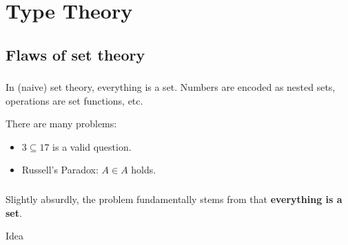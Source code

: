 
\section{Type Theory}

\subsection{Flaws of set theory}
\begin{frame}\frametitle{\insertsubsection}

In (naive) set theory, everything is a set. Numbers are encoded as nested sets, operations are set functions, etc.

There are many problems:

\begin{itemize}

\item \(3 \subseteq 17\) is a valid question.

\item Russell's Paradox: \(A \in A\) holds.

\end{itemize}

\end{frame}




\begin{frame}\frametitle{\insertsubsection}

Slightly absurdly, the problem fundamentally stems from that \textbf{everything is a set}.

\begin{exampleblock}{Idea}



\end{exampleblock}

\end{frame}
